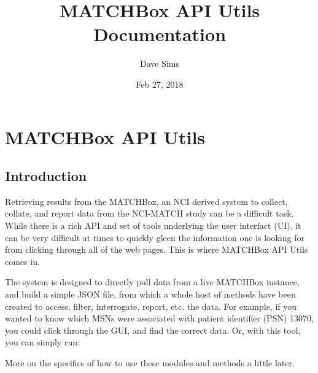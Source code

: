 \documentclass[letterpaper,10pt,english]{sphinxmanual}
\title{MATCHBox API Utils Documentation}
\date{Feb 27, 2018}
\author{Dave Sims}
\begin{document}
\maketitle
\sphinxtableofcontents
{}\label{\detokenize{index::doc}}



\chapter{MATCHBox API Utils}
\label{\detokenize{intro::doc}}\label{\detokenize{intro:welcome-to-matchbox-api-utils-documentation}}\label{\detokenize{intro:matchbox-api-utils}}

\section{Introduction}
\label{\detokenize{intro:introduction}}
Retrieving results from the MATCHBox, an NCI derived system to collect, collate,
and report data from the NCI-MATCH study can be a difficult task.  While there is
a rich API and set of tools underlying the user interfact (UI), it can be very
difficult at times to quickly gleen the information one is looking for from clicking
through all of the web pages.  This is where MATCHBox API Utils comes in.

The system is designed to directly pull data from a live MATCHBox instance, and
build a simple JSON file, from which a whole host of methods have been created
to access, filter, interrogate, report, etc. the data.  For example, if you wanted
to know which MSNs were associated with patient identifier (PSN) 13070, you could
click through the GUI, and find the correct data.  Or, with this tool, you can
simply run:

%
\begin{sphinxVerbatim}[commandchars=\\\{\}]
   
  
\end{sphinxVerbatim}

More on the specifics of how to use these modules and methods a little later.
\end{document}
